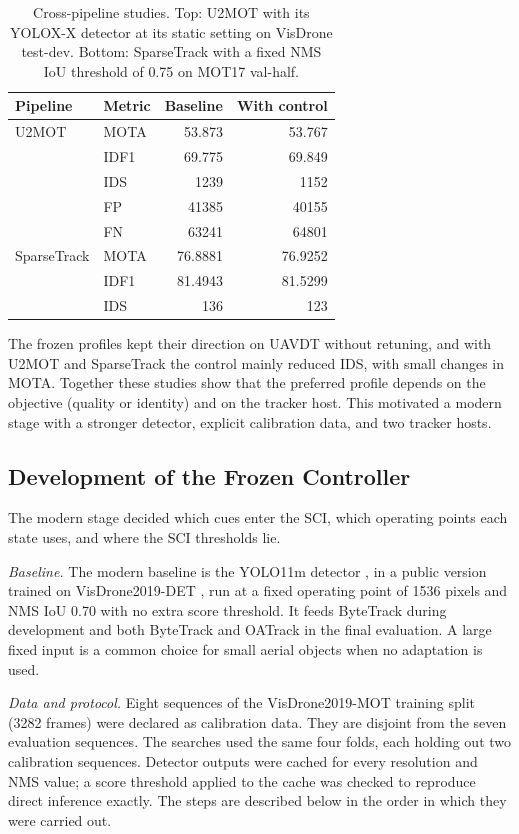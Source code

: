 \begin{table}[tbp]
\centering
\caption{Cross-pipeline studies. Top: U2MOT with its YOLOX-X detector at its static setting on VisDrone test-dev. Bottom: SparseTrack with a fixed NMS IoU threshold of 0.75 on MOT17 val-half.}
\label{tab:ac-u2mot}
\begin{tabular}{llrr}
\toprule
Pipeline & Metric & Baseline & With control\\
\midrule
U2MOT & MOTA & 53.873 & 53.767\\
 & IDF1 & 69.775 & 69.849\\
 & IDS & 1239 & 1152\\
 & FP & 41385 & 40155\\
 & FN & 63241 & 64801\\
\midrule
SparseTrack & MOTA & 76.8881 & 76.9252\\
 & IDF1 & 81.4943 & 81.5299\\
 & IDS & 136 & 123\\
\bottomrule
\end{tabular}
\end{table}

The frozen profiles kept their direction on UAVDT without retuning, and with U2MOT and SparseTrack the control mainly reduced IDS, with small changes in MOTA. Together these studies show that the preferred profile depends on the objective (quality or identity) and on the tracker host. This motivated a modern stage with a stronger detector, explicit calibration data, and two tracker hosts.

\subsection{Development of the Frozen Controller}\label{sec:ac-modern}
The modern stage decided which cues enter the SCI, which operating points each state uses, and where the SCI thresholds lie.

\emph{Baseline.} The modern baseline is the YOLO11m detector \cite{jocher2024yolo11}, in a public version trained on VisDrone2019-DET \cite{zhu2022visdrone}, run at a fixed operating point of 1536 pixels and NMS IoU 0.70 with no extra score threshold. It feeds ByteTrack \cite{zhang2022bytetrack} during development and both ByteTrack and OATrack \cite{qi2026oatrack} in the final evaluation. A large fixed input is a common choice for small aerial objects when no adaptation is used.

\emph{Data and protocol.} Eight sequences of the VisDrone2019-MOT training split (3282 frames) were declared as calibration data. They are disjoint from the seven evaluation sequences. The searches used the same four folds, each holding out two calibration sequences. Detector outputs were cached for every resolution and NMS value; a score threshold applied to the cache was checked to reproduce direct inference exactly. The steps are described below in the order in which they were carried out.

